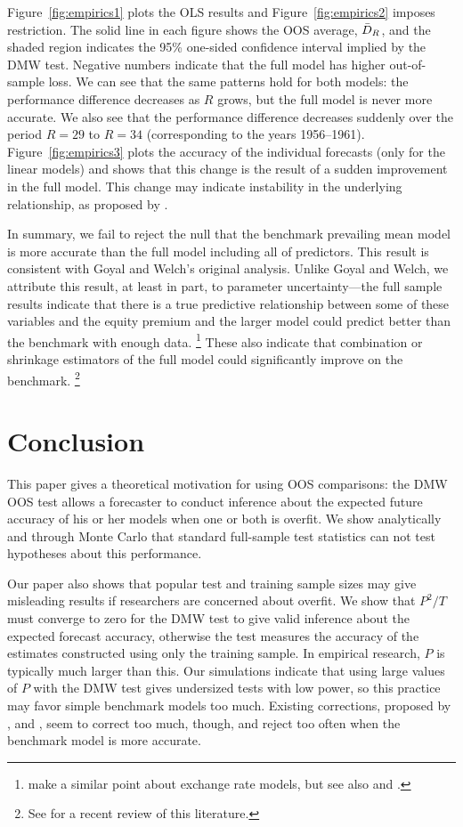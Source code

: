 \documentclass[12pt]{article}
\begin{document}
Figure~\ref{fig:empirics1} plots the OLS results and
Figure~\ref{fig:empirics2} imposes  restriction. The
solid line in each figure shows the OOS average, $\bar{D}_{R}$, and the
shaded region indicates the 95\% one-sided confidence interval implied
by the DMW test.  Negative numbers indicate that the full model has
higher out-of-sample loss.  We can see that the same patterns hold for
both models: the performance difference decreases as $R$ grows, but
the full model is never more accurate.  We also see that the
performance difference decreases suddenly over the period $R=29$ to
$R=34$ (corresponding to the years 1956--1961).
Figure~\ref{fig:empirics3} plots the accuracy of the individual
forecasts (only for the linear models) and shows that this change is
the result of a sudden improvement in the full model.  This change may
indicate instability in the underlying relationship, as proposed by
\citet{GoW:08}.

In summary, we fail to reject the null that the benchmark prevailing
mean model is more accurate than the full model including all of
 predictors.  This result is consistent with Goyal and
Welch's original analysis.  Unlike Goyal and Welch, we attribute this
result, at least in part, to parameter uncertainty---the full sample
results indicate that there is a true predictive relationship between
some of these variables and the equity premium and the larger model
could predict better than the benchmark with enough data.%
\footnote{\citet{BWB:10} make a similar point about exchange rate
  models, but see also \citet{Chi:10} and \citet{Gia:10}.} %
These also indicate that combination or shrinkage estimators of the
full model could significantly improve on the benchmark.%
\footnote{See \citet{RaZ:12} for a recent review of this
  literature.} %

\section{Conclusion}
\label{sec:conclusion}

This paper gives a theoretical motivation for using OOS comparisons:
the DMW OOS test allows a forecaster to conduct inference about
the expected future accuracy of his or her models when one or both is
overfit.  We show analytically and through Monte Carlo that standard
full-sample test statistics can not test hypotheses about this
performance.

Our paper also shows that popular test and training sample sizes may
give misleading results if researchers are concerned about overfit.
We show that $P^2/T$ must converge to zero for the DMW test to give
valid inference about the expected forecast accuracy, otherwise the
test measures the accuracy of the estimates constructed using only the
training sample.  In empirical research, $P$ is typically much larger
than this.  Our simulations indicate that using large values of $P$
with the DMW test gives undersized tests with low power, so this
practice may favor simple benchmark models too much.  Existing
corrections, proposed by \citet{ClM:01,ClM:05}, \citet{Mcc:07} and
\citet{ClW:06,ClW:07}, seem to correct too much, though, and reject
too often when the benchmark model is more accurate.
\end{document}
